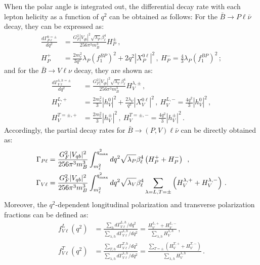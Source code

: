 \documentclass[prd,preprint,superscriptaddress,amsmath,amssymb]{revtex4}
\begin{document}
 When the polar angle is integrated out, the differential decay rate with each lepton helicity as a function of $q^2$  can be obtained as follows: For the $\bar B \to P \ell \bar \nu$ decay,  they can be expressed as:
 \begin{align}
 \frac{d \Gamma^{h=\pm}_{P \ell}}{dq^2 } & = \frac{G^2_F |V_{qb}|^2 \sqrt{\lambda_P} \beta^4_\ell}{256 \pi^3 m^3_B} H^{\pm}_{P}\,, \label{eq:Gah_P}\\
 H^+_{P} &= \frac{2 m^2_\ell }{3 q^2 }\lambda_P  (f^{BP}_1)^2  + 2  q^2 |X^{0\ell}_P|^2\,, ~
 H^-_{P}  =\frac{4}{3} \lambda_P (f^{BP}_1)^2 \,; \nonumber 
 \end{align}
and for the $\bar B\to V \ell \nu$ decay, they are shown as:
  \begin{align}
 \frac{d \Gamma^{\lambda, h=\pm}_{V\ell}}{dq^2 } & = \frac{G^2_F |V_{qb}|^2 \sqrt{\lambda_{V}} \beta^4_\ell}{256 \pi^3 m^3_B} H^{\lambda, \pm}_{V}\,, \label{eq:Gah_V} \\
 H^{L,+}_{V} &= \frac{2 m^2_\ell  }{3 } |h^0_{V}|^2 +  \frac{2 \lambda_{V} }{q^2}  |X^{0\ell}_{V}|^2\,, ~ H^{L,-}_{V}  =\frac{4 q^2 }{3}  |h^0_{V}|^2\,, \nonumber \\
 H^{T=\pm,+}_{V} &= \frac{2 m^2_\ell  }{3 } |h^{\pm}_{V}|^2 \,, ~ H^{T=\pm,-}_{V} = \frac{4 q^2 }{3 } |h^{\pm}_{V}|^2\,. \nonumber
 \end{align}
 Accordingly, the partial decay rates  for $\bar B \to (P, V) \ell \bar\nu$ can be directly obtained as:
  \begin{align}
  \Gamma_{P\ell}& = \frac{G^2_F |V_{qb}|^2 }{256 \pi^3 m^3_B}  \int^{q^2_{\rm max}} _{m^2_\ell}  dq^2    \sqrt{\lambda_P} \beta^4_\ell \left( H^{+}_{P} + H^{-}_{P} \right)\   \,, \nonumber \\
   \Gamma_{V\ell}& =  \frac{G^2_F |V_{qb}|^2 }{256 \pi^3 m^3_B}  \int^{q^2_{\rm max}} _{m^2_\ell}  dq^2  \sqrt{\lambda_{V}} \beta^4_\ell \sum_{\lambda=L,T=\pm}\left( H^{\lambda, +}_{V} + H^{\lambda,-}_V \right)\,. \label{eq:GammaBPV}
  \end{align}
  Moreover, the $q^2$-dependent longitudinal polarization and transverse polarization fractions can be defined as:
  \begin{align}
  f^{L}_{V\ell}(q^2) & = \frac{\sum_{h} d\Gamma^{L,h}_{V\ell}/dq^2 }{\sum_{\lambda, h}  d\Gamma^{\lambda,h}_{V\ell} /dq^2} = \frac{H^{L,+}_V + H^{L,-}_V}{\sum_{\lambda,h} H^{\lambda,h}_V} \,, \label{eq:fL}\\
  f^{T}_{V\ell} (q^2)&=  \frac{\sum_{T,h} d\Gamma^{T,h}_{V\ell}/dq^2 }{\sum_{\lambda, h}  d\Gamma^{\lambda,h}_{V\ell} /dq^2} = \frac{\sum_{T=\pm} \left( H^{T,+}_V + H^{T,-}_V \right)}{\sum_{\lambda,h} H^{\lambda,h}_V}\,. \label{eq:fT}
  \end{align}
  
\end{document}
